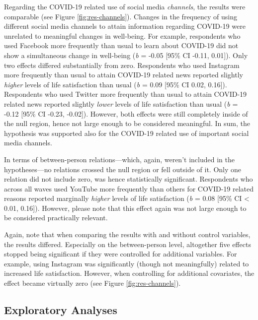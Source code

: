 \documentclass[
  man,mask]{apa6}
\begin{document}
Regarding the COVID-19 related use of social media \emph{channels}, the results were comparable (see Figure \ref{fig:res-channels}).
Changes in the frequency of using different social media channels to attain information regarding COVID-19 were unrelated to meaningful changes in well-being.
For example, respondents who used Facebook more frequently than usual to learn about COVID-19 did not show a simultaneous change in well-being (\emph{b} = -0.05 {[}95\% CI -0.11, 0.01{]}).
Only two effects differed substantially from zero.
Respondents who used Instagram more frequently than usual to attain COVID-19 related news reported slightly \emph{higher} levels of life satisfaction than usual (\emph{b} = 0.09 {[}95\% CI 0.02, 0.16{]}).
Respondents who used Twitter more frequently than usual to attain COVID-19 related news reported slightly \emph{lower} levels of life satisfaction than usual (\emph{b} = -0.12 {[}95\% CI -0.23, -0.02{]}).
However, both effects were still completely inside of the null region, hence not large enough to be considered meaningful.
In sum, the hypothesis was supported also for the COVID-19 related use of important social media channels.

In terms of between-person relations---which, again, weren't included in the hypotheses---no relations crossed the null region or fell outside of it.
Only one relation did not include zero, was hence statistically significant.
Respondents who across all waves used YouTube more frequently than others for COVID-19 related reasons reported marginally \emph{higher} levels of life satisfaction (\emph{b} = 0.08 {[}95\% CI \textless{} 0.01, 0.16{]}).
However, please note that this effect again was not large enough to be considered practically relevant.

Again, note that when comparing the results with and without control variables, the results differed.
Especially on the between-person level, altogether five effects stopped being significant if they were controlled for additional variables.
For example, using Instagram was significantly (though not meaningfully) related to increased life satisfaction.
However, when controlling for additional covariates, the effect became virtually zero (see Figure \ref{fig:res-channels}).

\hypertarget{exploratory-analyses}{%
\subsection{Exploratory Analyses}\label{exploratory-analyses}}
\end{document}
